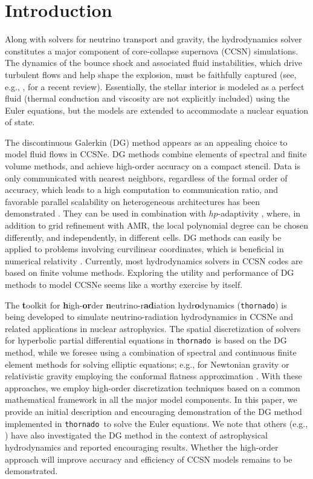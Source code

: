 \documentclass[letterpaper]{jpconf}
\newcommand{\thornado}{\texttt{thornado}}
\begin{document}
\section{Introduction}

Along with solvers for neutrino transport and gravity, the hydrodynamics solver constitutes a major component of core-collapse supernova (CCSN) simulations.  
The dynamics of the bounce shock and associated fluid instabilities, which drive turbulent flows and help shape the explosion, must be faithfully captured (see, e.g., \cite{muller_2016}, for a recent review).  
Essentially, the stellar interior is modeled as a perfect fluid (thermal conduction and viscosity are not explicitly included) using the Euler equations, but the models are extended to accommodate a nuclear equation of state.  

The discontinuous Galerkin (DG) method \cite{cockburnShu_2001,hesthavenWarburton_2008} appears as an appealing choice to model fluid flows in CCSNe.  
DG methods combine elements of spectral and finite volume methods, and achieve high-order accuracy on a compact stencil.  
Data is only communicated with nearest neighbors, regardless of the formal order of accuracy, which leads to a high computation to communication ratio, and favorable parallel scalability on heterogeneous architectures has been demonstrated \cite{klockner_etal_2009}.  
They can be used in combination with $hp$-adaptivity \cite{remacle_etal_2003}, where, in addition to grid refinement with AMR, the local polynomial degree can be chosen differently, and independently, in different cells.  
DG methods can easily be applied to problems involving curvilinear coordinates, which is beneficial in numerical relativity \cite{teukolsky_2016}.  
Currently, most hydrodynamics solvers in CCSN codes are based on finite volume methods.  
Exploring the utility and performance of DG methods to model CCSNe seems like a worthy exercise by itself.  

The {\bf t}oolkit for {\bf h}igh-{\bf or}der {\bf n}eutrino-r{\bf ad}iation hydr{\bf o}dynamics (\thornado) is being developed to simulate neutrino-radiation hydrodynamics in CCSNe and related applications in nuclear astrophysics.  
The spatial discretization of solvers for hyperbolic partial differential equations in \thornado\ is based on the DG method, while we foresee using a combination of spectral and continuous finite element methods for solving elliptic equations; e.g., for Newtonian gravity or relativistic gravity employing the conformal flatness approximation \cite{wilson_etal_1996}.  
With these approaches, we employ high-order discretization techniques based on a common mathematical framework in all the major model components.  
In this paper, we provide an initial description and encouraging demonstration of the DG method implemented in \thornado\ to solve the Euler equations.  
We note that others (e.g., \cite{radiceRezzolla_2011,schaal_etal_2015}) have also investigated the DG method in the context of astrophysical hydrodynamics and reported encouraging results.  
Whether the high-order approach will improve accuracy and efficiency of CCSN models remains to be demonstrated.  
\end{document}
